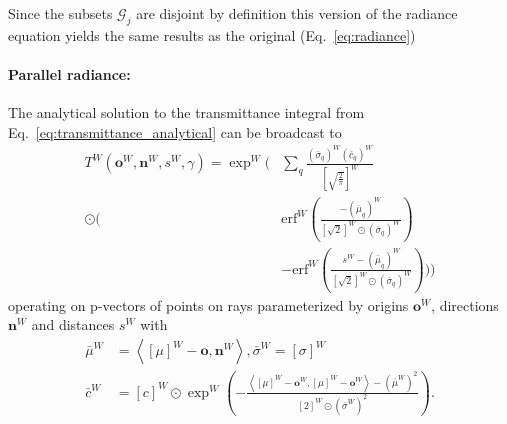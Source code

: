 \documentclass[a4paper, 11pt]{memoir}
\newcommand*{\erf}{\text{erf}}
\begin{document}
    Since the subsets $\mathcal{G}_j$ are disjoint by definition this version of the \gls{radiance} equation yields the
    same results as the original (Eq.~\eqref{eq:radiance})

    \paragraph{Parallel \gls{radiance}:}
    \label{par:parallel_radiance}
    The analytical solution to the \gls{transmittance} integral from Eq.~\eqref{eq:transmittance_analytical} can be broadcast
    to
    \begin{equation}
        \begin{aligned}
            T^W(\mathbf{o}^W, \mathbf{n}^W, s^W, \gamma) = \exp^W\Bigg(& \sum_q \frac{(\bar{\sigma}_q)^W
            (\bar{c}_q)^W}{\left[ \sqrt{\frac{2}{\pi}} \right]^W} \\
            \odot \Bigg(& \erf^W{\left( \frac{-(\bar{\mu}_q)^W}{[ \sqrt{2} ]^W \odot (\bar{\sigma}_q)^W} \right)}\\
            &- \erf^W{\left( \frac{s^W - (\bar{\mu}_q)^W}{[ \sqrt{2} ]^W \odot (\bar{\sigma}_q)^W} \right)} \Bigg) \Bigg)
        \end{aligned}
        \label{eq:transmittance_broadcast}
    \end{equation}
    operating on p-vectors of points on rays parameterized by origins $\mathbf{o}^W$, directions $\mathbf{n}^W$
    and distances $s^W$ with
    \begin{align*}
        \bar{\mu}^W &= \left\langle [ \mu ]^W - \mathbf{o}, \mathbf{n}^W \right\rangle, \bar{\sigma}^W = \left[ \sigma \right]^W\\
        \bar{c}^W &= [c]^W \odot \exp^W{\left( - \frac{\left\langle [\mu]^W - \mathbf{o}^W, [\mu]^W - \mathbf{o}^W \right\rangle
    - \left(\bar{\mu}^W\right)^2}{[2]^W \odot \left(\bar{\sigma}^W\right)^2} \right)}.
    \end{align*}
\end{document}
